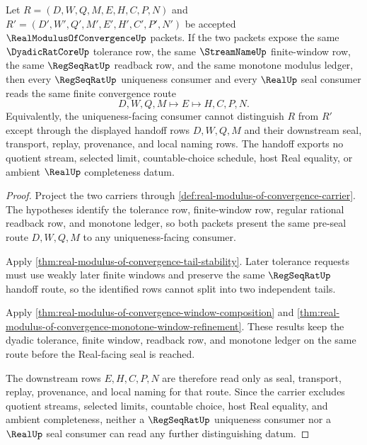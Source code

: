 \begin{theorem}
\label{thm:real-modulus-convergence-regseqrat-uniqueness-handoff}
Let $R=(D,W,Q,M,E,H,C,P,N)$ and $R'=(D',W',Q',M',E',H',C',P',N')$ be accepted $\RealModulusOfConvergenceUp$ packets. If the two packets expose the same $\DyadicRatCoreUp$ tolerance row, the same $\StreamNameUp$ finite-window row, the same $\RegSeqRatUp$ readback row, and the same monotone modulus ledger, then every $\RegSeqRatUp$ uniqueness consumer and every $\RealUp$ seal consumer reads the same finite convergence route
$$
D,W,Q,M \longmapsto E \longmapsto H,C,P,N .
$$
Equivalently, the uniqueness-facing consumer cannot distinguish $R$ from $R'$ except through the displayed handoff rows $D,W,Q,M$ and their downstream seal, transport, replay, provenance, and local naming rows. The handoff exports no quotient stream, selected limit, countable-choice schedule, host Real equality, or ambient $\RealUp$ completeness datum.
\end{theorem}
\begin{proof}
Project the two carriers through \autoref{def:real-modulus-of-convergence-carrier}. The hypotheses identify the tolerance row, finite-window row, regular rational readback row, and monotone ledger, so both packets present the same pre-seal route $D,W,Q,M$ to any uniqueness-facing consumer.

Apply \autoref{thm:real-modulus-of-convergence-tail-stability}. Later tolerance requests must use weakly later finite windows and preserve the same $\RegSeqRatUp$ handoff route, so the identified rows cannot split into two independent tails.

Apply \autoref{thm:real-modulus-of-convergence-window-composition} and \autoref{thm:real-modulus-of-convergence-monotone-window-refinement}. These results keep the dyadic tolerance, finite window, readback row, and monotone ledger on the same route before the Real-facing seal is reached.

The downstream rows $E,H,C,P,N$ are therefore read only as seal, transport, replay, provenance, and local naming for that route. Since the carrier excludes quotient streams, selected limits, countable choice, host Real equality, and ambient completeness, neither a $\RegSeqRatUp$ uniqueness consumer nor a $\RealUp$ seal consumer can read any further distinguishing datum.
\end{proof}

